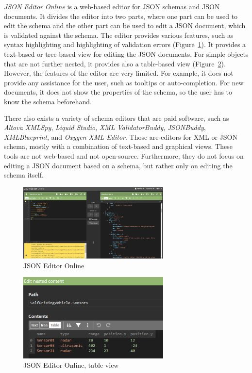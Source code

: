 \textit{JSON Editor Online}\cite{jsoneditoronlineJSONEditor} is a web-based editor for JSON schemas and JSON documents.
It divides the editor into two parts, where one part can be used to edit the schema and the other part can be used to edit a JSON document,
which is validated against the schema.
The editor provides various features, such as syntax highlighting and highlighting of validation errors (Figure~\ref{fig:jsoneditoronline}).
It provides a text-based or tree-based view for editing the JSON documents.
For simple objects that are not further nested, it provides also a table-based view (Figure~\ref{fig:jsoneditoronline_table}).
However, the features of the editor are very limited.
For example, it does not provide any assistance for the user, such as tooltips or auto-completion.
For new documents, it does not show the properties of the schema, so the user has to know the schema beforehand.

There also exists a variety of schema editors that are paid software, such as \textit{Altova XMLSpy}\cite{altovaEditorXMLSpy},
\textit{Liquid Studio}\cite{liquidtechnologiesJSONSchema}, \textit{XML ValidatorBuddy}\cite{xmlbuddyEditorValidator},
\textit{JSONBuddy}\cite{jsonbuddyJSONSchema}, \textit{XMLBlueprint}\cite{xmlblueprintEditorXMLBlueprint},
and \textit{Oxygen XML Editor}\cite{oxygenxmlCompleteSolution}.
Those are editors for XML or JSON schema, mostly with a combination of text-based and graphical views.
These tools are not web-based and not open-source.
Furthermore, they do not focus on editing a JSON document based on a schema,
but rather only on editing the schema itself.
\begin{figure}[htb]
    \centering
    \includegraphics[width=3in]{figures/jsoneditoronline}
    \caption{JSON Editor Online}
    \label{fig:jsoneditoronline}
\end{figure}
\begin{figure}[htb]
    \centering
    \includegraphics[width=3in]{figures/jsoneditoronline-table}
    \caption{JSON Editor Online, table view}
    \label{fig:jsoneditoronline_table}
\end{figure}



